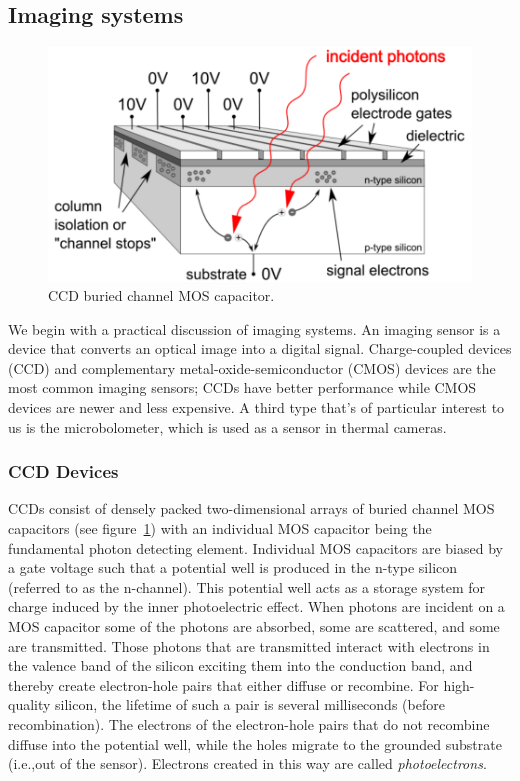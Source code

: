 \subsection{Imaging systems}\label{subsec:imaging-systems}
\begin{figure}
	\includegraphics[width=\linewidth,keepaspectratio]{figures/background/bccd.png}
	\caption{CCD buried channel MOS capacitor\cite{finaltestguideline}.}
	\label{fig:mos-cap}
\end{figure}
We begin with a practical discussion of imaging systems.
%
An imaging sensor is a device that converts an optical image into a digital signal.
%
Charge-coupled devices (CCD) and complementary metal-oxide-semiconductor (CMOS) devices are the most common imaging sensors;
%
CCDs have better performance while CMOS devices are newer and less expensive.
%
A third type that's of particular interest to us is the microbolometer, which is used as a sensor in thermal cameras.
\subsubsection{CCD Devices}
CCDs consist of densely packed two-dimensional arrays of buried channel MOS capacitors (see figure~\ref{fig:mos-cap}) with an individual MOS capacitor being the fundamental photon detecting element.
%
Individual MOS capacitors are biased by a gate voltage such that a potential well is produced in the n-type silicon (referred to as the n-channel).
%
This potential well acts as a storage system for charge induced by the inner photoelectric effect.
%
When photons are incident on a MOS capacitor some of the photons are absorbed, some are scattered, and some are transmitted.
%
Those photons that are transmitted interact with electrons in the valence band of the silicon exciting them into the conduction band, and thereby create electron-hole pairs that either diffuse or recombine.
%
For high-quality silicon, the lifetime of such a pair is several milliseconds (before recombination)\cite{scientificccd}.
%
The electrons of the electron-hole pairs that do not recombine diffuse into the potential well, while the holes migrate to the grounded substrate (i.e.,out of the sensor).
%
Electrons created in this way are called \textit{photoelectrons}.

